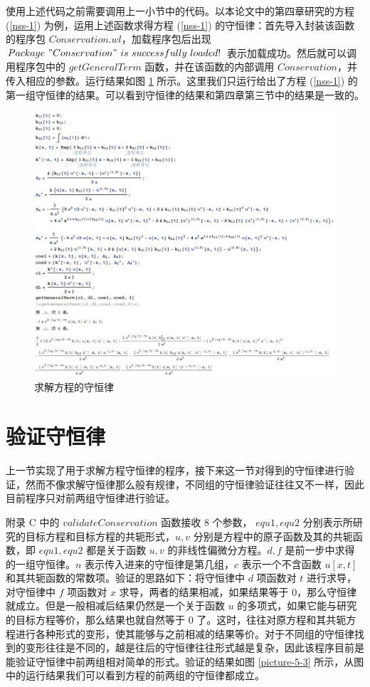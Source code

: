使用上述代码之前需要调用上一小节中的代码。以本论文中的第四章研究的方程 (\ref{nss-1}) 为例，运用上述函数求得方程 (\ref{nss-1}) 的守恒律：首先导入封装该函数的程序包 $Conservation.wl$，加载程序包后出现 $Package \ "Conservation" \ is \ successfully \  loaded!$ 表示加载成功。然后就可以调用程序包中的 $getGeneralTerm$ 函数，并在该函数的内部调用 $Conservation$，并传入相应的参数。运行结果如图 \ref{picture-5-2} 所示。这里我们只运行给出了方程 (\ref{nss-1}) 的第一组守恒律的结果。可以看到守恒律的结果和第四章第三节中的结果是一致的。
\begin{figure}[!htp]
\centering
\includegraphics[width=\linewidth]{getConservation.jpg}
\caption{求解方程的守恒律}
\label{picture-5-2}
\end{figure}

\section{验证守恒律}
上一节实现了用于求解方程守恒律的程序，接下来这一节对得到的守恒律进行验证，然而不像求解守恒律那么般有规律，不同组的守恒律验证往往又不一样，因此目前程序只对前两组守恒律进行验证。

附录 C 中的 $validateConservation$ 函数接收 8 个参数， $equ1, equ2$ 分别表示所研究的目标方程和目标方程的共轭形式，$u, v$ 分别是方程中的原子函数及其的共轭函数，即 $equ1, equ2$ 都是关于函数 $u, v$ 的非线性偏微分方程。$d, f$ 是前一步中求得的一组守恒律。$n$ 表示传入进来的守恒律是第几组，$c$ 表示一个不含函数 $u[x,t]$ 和其共轭函数的常数项。验证的思路如下：将守恒律中 $d$ 项函数对 $t$ 进行求导，对守恒律中 $f$ 项函数对 $x$ 求导，两者的结果相减，如果结果等于 0，那么守恒律就成立。但是一般相减后结果仍然是一个关于函数 $u$ 的多项式，如果它能与研究的目标方程等价，那么结果也就自然等于 0 了。这时，往往对原方程和其共轭方程进行各种形式的变形，使其能够与之前相减的结果等价。对于不同组的守恒律找到的变形往往是不同的，越是往后的守恒律往往形式越是复杂，因此该程序目前是能验证守恒律中前两组相对简单的形式。验证的结果如图  \ref{picture-5-3} 所示，从图中的运行结果我们可以看到方程的前两组的守恒律都成立。

